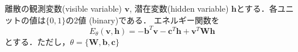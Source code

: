 離散の観測変数(visible variable) $\mathbf{v}$, 潜在変数(hidden variable) $\mathbf{h}$とする．各ユニットの値は$\{0, 1\}$の2値 (binary)である．
エネルギー関数を
$$
E_\theta(\mathbf{v}, \mathbf{h})=-\mathbf{b}^T \mathbf{v} - \mathbf{c}^T \mathbf{h} + \mathbf{v}^T \mathbf{W} \mathbf{h}
$$
とする．ただし，$\theta=\{\mathbf{W}, \mathbf{b}, \mathbf{c}\}$